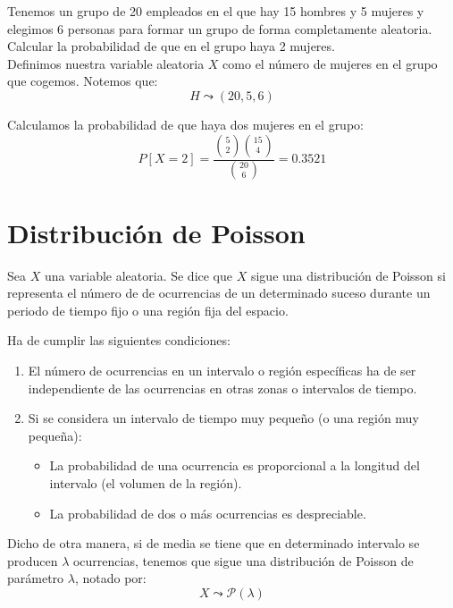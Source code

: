 \begin{ejemplo}
    Tenemos un grupo de 20 empleados en el que hay 15 hombres y 5 mujeres y elegimos 6 personas para formar un grupo de forma completamente aleatoria.
    Calcular la probabilidad de que en el grupo haya 2 mujeres.\\
    
    Definimos nuestra variable aleatoria $X$ como el número de mujeres en el grupo que cogemos. Notemos que:
    \begin{equation*}
        H\leadsto (20, 5, 6)
    \end{equation*}
    
    Calculamos la probabilidad de que haya dos mujeres en el grupo:
    \begin{equation*}
        P[X=2]=\frac{\binom{5}{2}\binom{15}{4}}{\binom{20}{6}} = 0.3521
    \end{equation*}
\end{ejemplo}


\section{Distribución de Poisson}

\begin{definicion}
    Sea $X$ una variable aleatoria. Se dice que $X$ sigue una distribución de Poisson si representa el número de de ocurrencias de un determinado suceso durante un periodo de tiempo fijo o una región fija del espacio.

    Ha de cumplir las siguientes condiciones:
    \begin{enumerate}
        \item El número de ocurrencias en un intervalo o región específicas ha de ser independiente de las ocurrencias en otras zonas o intervalos de tiempo.

        \item Si se considera un intervalo de tiempo muy pequeño (o una región muy pequeña):
        \begin{itemize}
            \item La probabilidad de una ocurrencia es proporcional a la longitud del intervalo (el volumen de la región).
            \item La probabilidad de dos o más ocurrencias es despreciable.
        \end{itemize}
    \end{enumerate}

    Dicho de otra manera, si de media se tiene que en determinado intervalo se producen $\lambda$ ocurrencias, tenemos que sigue una distribución de Poisson de parámetro $\lambda$, notado por:
    \begin{equation*}
        X\leadsto \mathcal{P}(\lambda)
    \end{equation*}
\end{definicion}

